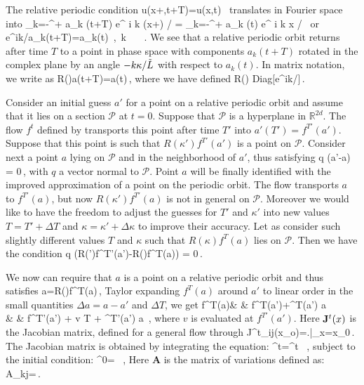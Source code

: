 The relative periodic condition
\beq
	u(x+\kappa,t+T)=u(x,t) \,
\eeq
translates in Fourier space into
\beq	
	\sum_{k=-\infty}^{+\infty} a_k (t+T) e^{ i k (x+\kappa) / \tildeL} 
		= \sum_{k=-\infty}^{+\infty} a_k (t) e^{ i k x / \tildeL} \,
\eeq
or
\beq
	e^{ik\kappa/\tildeL}a_k(t+T)=a_k(t) \,,\ \forall k \in {}\ \ \ .
	\label{eq:RPOcondition}
\eeq
We see that a relative periodic orbit returns after time $T$ to a point in 
phase space with components $a_k(t+T)$ rotated in the complex plane by an 
angle $-k\kappa/\tilde{L}$ with respect to $a_k(t)$. In matrix notation, we write  as
\beq
	R(\kappa)a(t+T)=a(t)\,,
	\label{eq:RPO}
\eeq
where we have defined
\beq
	R(\kappa) \equiv Diag[e^{ik\kappa/\tildeL}]\,.
\eeq

Consider an initial guess $a'$ for a point on a relative periodic orbit and assume that it lies on
a \Poincare section $\mathcal{P}$ at $t=0$. Suppose that $\mathcal{P}$ is a hyperplane in
$\mathds{R}^{2d}$. The flow $f^t$ defined by  transports 
this point after time $T'$ into $a'(T')=f^{T'}(a')$. Suppose that this point is such that $R(\kappa')f^{T'}(a')$
is a point on $\mathcal{P}$. Consider next a point $a$ lying on $\mathcal{P}$ and in the neighborhood of $a'$,
thus satisfying
\beq
	q \cdot (a'-a) = 0\,,
	\label{eq:cond a}
\eeq
with $q$ a vector normal to $\mathcal{P}$. Point $a$ will be finally identified with the improved 
approximation of a point on the periodic orbit.
The flow transports $a$ to $f^{T'}(a)$, but now $R(\kappa')f^{T'}(a)$ is not in general on $\mathcal{P}$.
Moreover we would like to have the freedom to adjust the guesses for $T'$ and $\kappa'$ into new values
$T=T'+\Delta T$ and $\kappa=\kappa'+\Delta \kappa$ to improve their accuracy. 
Let as consider such slightly different values $T$ and $\kappa$ such that $R(\kappa)f^{T}(a)$ lies on 
$\mathcal{P}$. Then we have the condition
\beq
	q \cdot(R(\kappa')f^{T'}(a')-R(\kappa)f^{T}(a)) = 0\,.
	\label{eq:cond Rf(a)}
\eeq 

 We now can require that $a$ is a point on a relative periodic orbit and thus satisfies 
\beq
	a=R(\kappa)f^{T}(a)\,,
	\label{eq:RPOcond}
\eeq
Taylor expanding $f^{T}(a)$ around $a'$ to linear order in the small quantities 
$\Delta a=a-a'$ and $\Delta T$, we get
\bea
	f^{T}(a)& \simeq & f^{T}(a')+\J^T(a') \Delta a \label{eq:fTaylorl1} \\ 
		& \simeq & f^{T'}(a') + v \Delta T + \J^{T'}(a') \Delta a \label{eq:fTaylorl2} \,, 
\eea
where $v$ is evaluated at $f^{T'}(a')$. Here $\mathbf{J}^t(x)$ is the Jacobian matrix, defined for a general flow through
\beq
   	J^t_{ij}(x_o)=\left.\right|_{x=x_0}\,.
\eeq
The Jacobian matrix is obtained by integrating the equation:
\beq
   	^t=^t \, ,
	\label{eq:Adef}
\eeq
subject to the initial condition:
\beq
   	^0= \, ,
\eeq
Here $\mathbf{A}$ is the matrix of variations defined as:
\beq
	A_{kj}=\,.
\eeq


